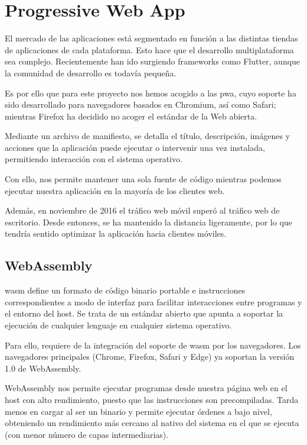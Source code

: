 \section{Progressive Web App}
\label{tec_hab:PWA}

El mercado de las aplicaciones está segmentado en función a las distintas tiendas de aplicaciones de cada plataforma. Esto hace que el desarrollo multiplataforma sea complejo. Recientemente han ido surgiendo frameworks como Flutter, aunque la comunidad de desarrollo es todavía pequeña.

Es por ello que para este proyecto nos hemos acogido a las \acrshort{pwa}, cuyo soporte ha sido desarrollado para navegadores basados en Chromium, así como Safari; mientras Firefox ha decidido no acoger el estándar de la Web abierta. \cite{firefoxNoPWA}

Mediante un archivo de manifiesto, se detalla el título, descripción, imágenes y acciones que la aplicación puede ejecutar o intervenir una vez instalada, permitiendo interacción con el sistema operativo.

Con ello, nos permite mantener una sola fuente de código mientras podemos ejecutar nuestra aplicación en la mayoría de los clientes web.

Además, en noviembre de 2016 el tráfico web móvil superó al tráfico web de escritorio. Desde entonces, se ha mantenido la distancia ligeramente, por lo que tendría sentido optimizar la aplicación hacia clientes móviles. \cite{movilTraficoMayor}

\subsection{WebAssembly}
\label{tec_hab:wam}


\acrfull{wasm} define un formato de código binario portable e instrucciones correspondientes a modo de interfaz para facilitar interacciones entre programas y el entorno del host. Se trata de un estándar abierto que apunta a soportar la ejecución de cualquier lenguaje en cualquier sistema operativo.

Para ello, requiere de la integración del soporte de \acrfull{wasm} por los navegadores. Los navegadores principales (Chrome, Firefox, Safari y Edge) ya soportan la versión 1.0 de WebAssembly.

WebAssembly nos permite ejecutar programas desde nuestra página web en el host con alto rendimiento, puesto que las instrucciones son precompiladas. Tarda menos en cargar al ser un binario y permite ejecutar órdenes a bajo nivel, obteniendo un rendimiento más cercano al nativo del sistema en el que se ejecuta (con menor número de capas intermediarias).

